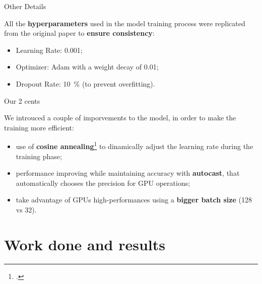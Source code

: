 	\begin{frame}{Other Details}

		All the \textbf{hyperparameters} used in the model training process were replicated from the original paper to
		\textbf{ensure consistency}:

		\begin{itemize}
			\item Learning Rate: \SI{0.001}{};
			\item Optimizer: Adam with a weight decay of \SI{0.01}{};
			\item Dropout Rate: \SI{10}{\percent} (to prevent overfitting).
		\end{itemize}

	\end{frame}

	\begin{frame}{Our 2 cents}

		We introuced a couple of imporvements to the model, in order to make the training more efficient:

		\begin{itemize}
		\item {use of \textbf{cosine annealing}\footcite{DBLP:journals/corr/LoshchilovH16a} to dinamically adjust the
  		learning rate during the training phase;}
		\item {performance improving while maintaining accuracy with \textbf{autocast}, that automatically chooses
  			the precision for GPU operations;}
		\item take advantage of GPUs high-performances using a \textbf{bigger batch size} (128 vs 32).
		\end{itemize}

	\end{frame}


\section[Work done and results]{Work done and results}	

